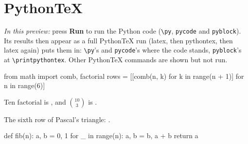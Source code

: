 \documentclass{article}
\begin{document}
\section*{PythonTeX}

\emph{In this preview:} press \textbf{Run} to run the Python code (\verb|\py|, \texttt{pycode} and \texttt{pyblock}).
Its results then appear as a full PythonTeX run (latex, then pythontex, then latex again) puts them in: \verb|\py|'s
and \texttt{pycode}'s where the code stands, \texttt{pyblock}'s at \verb|\printpythontex|. Other PythonTeX commands
are shown but not run.

\begin{pycode}
from math import comb, factorial
rows = [[comb(n, k) for k in range(n + 1)] for n in range(6)]
\end{pycode}

Ten factorial is , and $\binom{10}{3}$ is .

The sixth row of Pascal's triangle: .

\begin{pyverbatim}
def fib(n):
    a, b = 0, 1
    for _ in range(n):
        a, b = b, a + b
    return a
\end{pyverbatim}
\end{document}
